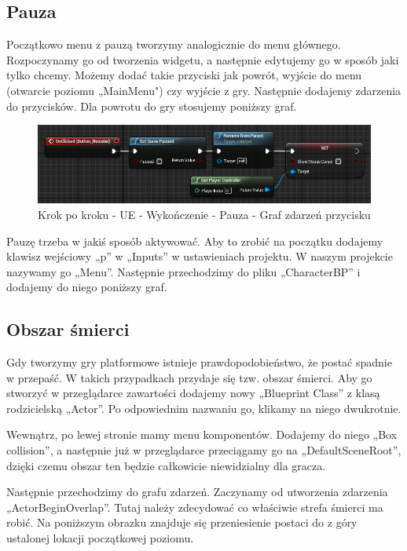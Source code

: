 \documentclass[12pt]{xmgr}
\begin{document}
\newpage
\subsection{Pauza}

Początkowo menu z pauzą tworzymy analogicznie do menu głównego. Rozpoczynamy go od tworzenia widgetu, a następnie edytujemy go w sposób jaki tylko chcemy. Możemy dodać takie przyciski jak powrót, wyjście do menu (otwarcie poziomu „MainMenu") czy wyjście z gry. Następnie dodajemy zdarzenia do przycisków. Dla powrotu do gry stosujemy poniższy graf.

\begin{figure}[!htb]
    \begin{center}
    \includegraphics[scale=0.5]{Screeny/UeKrokPoKroku/PauseButton}
    \end{center}
    \caption{Krok po kroku - UE - Wykończenie - Pauza - Graf zdarzeń przycisku}
\end{figure}

Pauzę trzeba w jakiś sposób aktywować. Aby to zrobić na początku dodajemy klawisz wejściowy „p” w „Inputs” w ustawieniach projektu. W naszym projekcie nazywamy go „Menu”. Następnie przechodzimy do pliku „CharacterBP” i dodajemy do niego poniższy graf.

\subsection{Obszar śmierci}

Gdy tworzymy gry platformowe istnieje prawdopodobieństwo, że postać spadnie w przepaść. W takich przypadkach przydaje się tzw. obszar śmierci. Aby go stworzyć w przeglądarce zawartości dodajemy nowy „Blueprint Class” z klasą rodzicielską „Actor”. Po odpowiednim nazwaniu go, klikamy na niego dwukrotnie. 

Wewnątrz, po lewej stronie mamy menu komponentów. Dodajemy do niego „Box collision”, a następnie już w przeglądarce przeciągamy go na „DefaultSceneRoot”, dzięki czemu obszar ten będzie całkowicie niewidzialny dla gracza. 

Następnie przechodzimy do grafu zdarzeń. Zaczynamy od utworzenia zdarzenia „ActorBeginOverlap”. Tutaj należy zdecydować co właściwie strefa śmierci ma robić. Na poniższym obrazku znajduje się przeniesienie postaci do z góry ustalonej lokacji początkowej poziomu.
\end{document}
